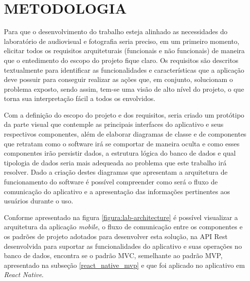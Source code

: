 \chapter{METODOLOGIA}
\label{cap3}

\vspace{-1.9cm}


    Para que o desenvolvimento do trabalho esteja alinhado as necessidades do laboratório de audiovisual e fotografia seria preciso, em um primeiro momento, elicitar todos os requisitos arquiteturais (funcionais e não funcionais) de maneira que o entedimento do escopo do projeto fique claro. Os requisitos são descritos textualmente para identificar as funcionalidades e características que a aplicação deve possuir para conseguir realizar as ações que, em conjunto, solucionam o problema exposto, sendo assim, tem-se uma visão de alto nível do projeto, o que torna sua interpretação fácil a todos os envolvidos.
    
    Com a definição do escopo do projeto e dos requisitos, seria criado um protótipo da parte visual que contemple as principais interfaces do aplicativo e seus respectivos componentes, além de elaborar diagramas de classe e de componentes que retratam como o software irá se comportar de maneira oculta e como esses componentes irão persistir dados, a estrutura lógica do banco de dados e qual tipologia de dados seria mais adequeada ao problema que este trabalho irá resolver. Dado a criação destes diagramas que apresentam a arquitetura de funcionamento do software é possível compreender como será o fluxo de comunicação do aplicativo e a apresentação das informações pertinentes aos usuários durante o uso.
    
    Conforme apresentado na figura \ref{figura:lab-architecture} é possível visualizar a arquitetura da aplicação \textit{mobile}, o fluxo de comunicação entre os componentes e os padrões de projeto adotados para desenvolver esta solução, na API Rest desenvolvida para suportar as funcionalidades do aplicativo e suas operações no banco de dados, encontra se o padrão MVC, semelhante ao padrão MVP, apresentado na subseção \ref{react_native_mvp} e que foi aplicado no aplicativo em \textit{React Native}.
    
    \clearpage
    
